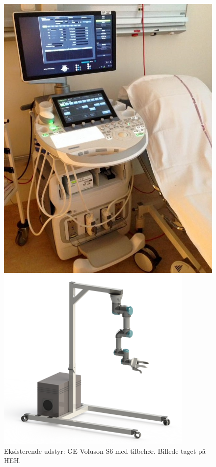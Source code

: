 \begin{figure}[H]
	\begin{minipage}{0.45\textwidth}
		\centering
		\includegraphics[width=\textwidth]{Figurer/udstyrHorsens.jpg}
		\caption{Eksisterende udstyr: GE Voluson S6 med tilbehør. Billede taget på HEH.}
		\label{udstyrHorsens}
	\end{minipage}
	\hspace{0.02\textwidth}
	\begin{minipage}{0.55\textwidth}
		\centering
		\includegraphics[width=\textwidth]{Figurer/StativMedUR3Render.png}

\end{minipage}
\end{figure}
